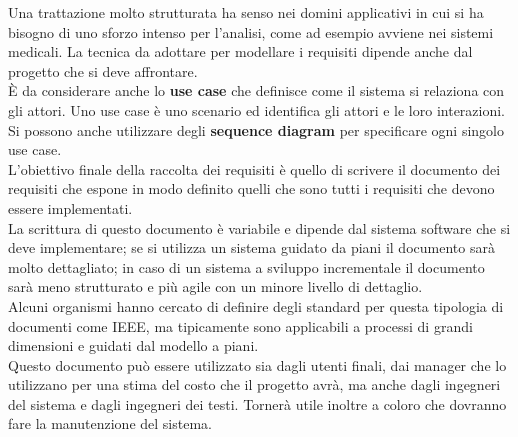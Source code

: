 Una trattazione molto strutturata ha senso nei domini applicativi in cui si ha bisogno di uno sforzo intenso per l'analisi, come ad esempio avviene nei sistemi medicali.
La tecnica da adottare per modellare i requisiti dipende anche dal progetto che si deve affrontare.\\
È da considerare anche lo \textbf{use case} che definisce come il sistema si relaziona con gli attori.
Uno use case è uno scenario ed identifica gli attori e le loro interazioni.
Si possono anche utilizzare degli \textbf{sequence diagram} per specificare ogni singolo use case.\\
L'obiettivo finale della raccolta dei requisiti è quello di scrivere il documento dei requisiti che espone in modo definito quelli che sono tutti i requisiti che devono essere implementati.\\
La scrittura di questo documento è variabile e dipende dal sistema software che si deve implementare; se si utilizza un sistema guidato da piani il documento sarà molto dettagliato; in caso di un sistema a sviluppo incrementale il documento sarà meno strutturato e più agile con un minore livello di dettaglio.\\
Alcuni organismi hanno cercato di definire degli standard per questa tipologia di documenti come \acrfull{IEEE}, ma tipicamente sono applicabili a processi di grandi dimensioni e guidati dal modello a piani.\\
Questo documento può essere utilizzato sia dagli utenti finali, dai manager che lo utilizzano per una stima del costo che il progetto avrà, ma anche dagli ingegneri del sistema e dagli ingegneri dei testi.
Tornerà utile inoltre a coloro che dovranno fare la manutenzione del sistema.

